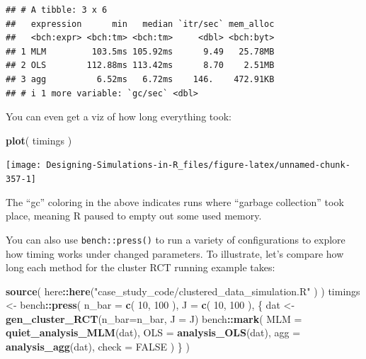\documentclass[
]{book}
\newenvironment{Shaded}{\begin{snugshade}}{\end{snugshade}}
\newcommand{\AttributeTok}[1]{\textcolor[rgb]{0.13,0.29,0.53}{#1}}
\newcommand{\ConstantTok}[1]{\textcolor[rgb]{0.56,0.35,0.01}{#1}}
\newcommand{\DecValTok}[1]{\textcolor[rgb]{0.00,0.00,0.81}{#1}}
\newcommand{\FunctionTok}[1]{\textcolor[rgb]{0.13,0.29,0.53}{\textbf{#1}}}
\newcommand{\NormalTok}[1]{#1}
\newcommand{\OtherTok}[1]{\textcolor[rgb]{0.56,0.35,0.01}{#1}}
\newcommand{\SpecialCharTok}[1]{\textcolor[rgb]{0.81,0.36,0.00}{\textbf{#1}}}
\newcommand{\StringTok}[1]{\textcolor[rgb]{0.31,0.60,0.02}{#1}}
\begin{document}
\begin{verbatim}
## # A tibble: 3 x 6
##   expression      min   median `itr/sec` mem_alloc
##   <bch:expr> <bch:tm> <bch:tm>     <dbl> <bch:byt>
## 1 MLM         103.5ms 105.92ms      9.49   25.78MB
## 2 OLS        112.88ms 113.42ms      8.70    2.51MB
## 3 agg          6.52ms   6.72ms    146.    472.91KB
## # i 1 more variable: `gc/sec` <dbl>
\end{verbatim}

You can even get a viz of how long everything took:

\begin{Shaded}
\begin{Highlighting}[]
\FunctionTok{plot}\NormalTok{( timings )}
\end{Highlighting}
\end{Shaded}

\begin{center}\texttt{[image: Designing-Simulations-in-R\_files/figure-latex/unnamed-chunk-357-1]} \end{center}

The ``gc'' coloring in the above indicates runs where ``garbage collection'' took place, meaning R paused to empty out some used memory.

You can also use \texttt{bench::press()} to run a variety of configurations to explore how timing works under changed parameters.
To illustrate, let's compare how long each method for the cluster RCT running example takes:

\begin{Shaded}
\begin{Highlighting}[]
\FunctionTok{source}\NormalTok{( here}\SpecialCharTok{::}\FunctionTok{here}\NormalTok{(}\StringTok{"case\_study\_code/clustered\_data\_simulation.R"}\NormalTok{ ) )}
\NormalTok{timings }\OtherTok{\textless{}{-}}\NormalTok{ bench}\SpecialCharTok{::}\FunctionTok{press}\NormalTok{(}
  \AttributeTok{n\_bar =} \FunctionTok{c}\NormalTok{( }\DecValTok{10}\NormalTok{, }\DecValTok{100}\NormalTok{ ),}
  \AttributeTok{J =} \FunctionTok{c}\NormalTok{( }\DecValTok{10}\NormalTok{, }\DecValTok{100}\NormalTok{ ),}
\NormalTok{  \{}
\NormalTok{    dat }\OtherTok{\textless{}{-}} \FunctionTok{gen\_cluster\_RCT}\NormalTok{(}\AttributeTok{n\_bar=}\NormalTok{n\_bar, }\AttributeTok{J =}\NormalTok{ J)}
\NormalTok{    bench}\SpecialCharTok{::}\FunctionTok{mark}\NormalTok{(}
      \AttributeTok{MLM =} \FunctionTok{quiet\_analysis\_MLM}\NormalTok{(dat),}
      \AttributeTok{OLS =} \FunctionTok{analysis\_OLS}\NormalTok{(dat),}
      \AttributeTok{agg =} \FunctionTok{analysis\_agg}\NormalTok{(dat),}
      \AttributeTok{check =} \ConstantTok{FALSE}
\NormalTok{    )}
\NormalTok{  \}}
\NormalTok{)}
\end{Highlighting}
\end{Shaded}
\end{document}
